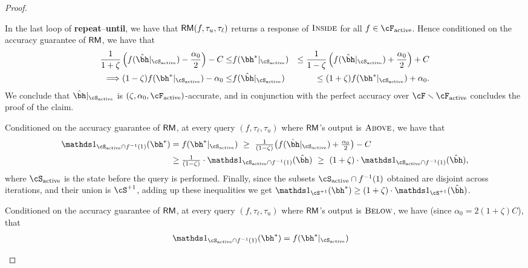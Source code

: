 \begin{proof}
\begin{description}[leftmargin=5pt]
        In the last loop of \textbf{repeat}--\textbf{until}, we have that $\mathsf{RM}(f, \tau_u, \tau_\ell)$ returns a response of $\textsc{Inside}$ for all $f \in \Factive$. Hence conditioned on the accuracy guarantee of $\mathsf{RM}$, we have that
            \begin{eqnarray*}
                \frac{1}{1+\zeta}\left( f(\hbh|_{\Sactive}) - \frac{\alpha_0}{2} \right) - C\leq & 
                f(\bh^{\ast}|_{\Sactive})
                & \leq \frac{1}{1-\zeta}\left( f(\hbh|_{\Sactive}) + \frac{\alpha_0}{2} \right) + C \\
                \Longrightarrow
                (1-\zeta)f(\bh^{\ast}|_{\Sactive}) -\alpha_0 \leq 
                & f(\hbh|_{\Sactive}) &
                \leq (1+\zeta)f(\bh^{\ast}|_{\Sactive}) + \alpha_0.
            \end{eqnarray*}
            We conclude that $\hbh|_{\Sactive}$ is $(\zeta,\alpha_0,\Factive)$-accurate, and in conjunction with the perfect accuracy over $\cF\setminus\Factive$ concludes the proof of the claim.
        \item[{\boldmath Case $\theta=\plus$}:] Conditioned on the accuracy guarantee of $\mathsf{RM}$, at every query $(f,\tau_\ell,\tau_u)$ where $\mathsf{RM}$'s output is $\textsc{Above}$, we have that
        \begin{align*}
        \textstyle
        \ind_{\Sactive\cap f^{-1}(1)}(\bh^{\ast})
            & \textstyle = f(\bh^{\ast}|_{\Sactive})
            ~\geq~ \frac{1}{(1-\zeta)}\big( f(\hbh|_{\Sactive}) + \frac{\alpha_0}{2} \big) - C\\
            &\textstyle\geq \frac{1}{(1-\zeta)} \cdot   \ind_{\Sactive\cap f^{-1}(1)}(\hbh) 
            ~\geq~ (1+\zeta) \cdot \ind_{\Sactive\cap f^{-1}(1)}(\hbh),
        \end{align*}
        where $\Sactive$ is the state before the query is performed.
            Finally, since the subsets $\Sactive\cap f^{-1}(1)$
        obtained are disjoint across iterations, and their union is $\Splus$, adding up these inequalities we get
            $\ind_{\Splus}(\bh^{\ast}) 
            \geq (1+\zeta) \cdot \ind_{\Splus}(\hbh)$.
        \item[{\boldmath Case $\theta=\minus$}:] Conditioned on the accuracy guarantee of $\mathsf{RM}$, at every query $(f, \tau_\ell, \tau_u)$ where $\mathsf{RM}$'s output is $\textsc{Below}$, we have 
        (since $\alpha_0 = 2(1+\zeta) C$), that
        \begin{align*}
            \textstyle \ind_{\Sactive\cap f^{-1}(1)}(\bh^{\ast})
            &\textstyle= f(\bh^{\ast}|_{\Sactive})

\end{align*}
\end{description}
\end{proof}
